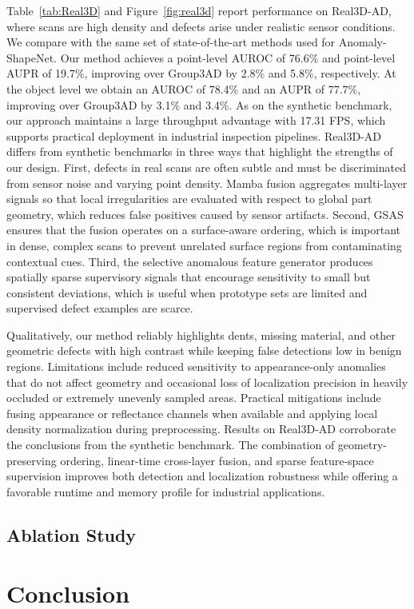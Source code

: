 Table~\ref{tab:Real3D} and Figure~\ref{fig:real3d} report performance on Real3D-AD, where scans are high density and defects arise under realistic sensor conditions. We compare with the same set of state-of-the-art methods used for Anomaly-ShapeNet. Our method achieves a point-level AUROC of 76.6\% and point-level AUPR of 19.7\%, improving over Group3AD by 2.8\% and 5.8\%, respectively. At the object level we obtain an AUROC of 78.4\% and an AUPR of 77.7\%, improving over Group3AD by 3.1\% and 3.4\%. As on the synthetic benchmark, our approach maintains a large throughput advantage with 17.31 FPS, which supports practical deployment in industrial inspection pipelines. Real3D-AD differs from synthetic benchmarks in three ways that highlight the strengths of our design. First, defects in real scans are often subtle and must be discriminated from sensor noise and varying point density. Mamba fusion aggregates multi-layer signals so that local irregularities are evaluated with respect to global part geometry, which reduces false positives caused by sensor artifacts. Second, GSAS ensures that the fusion operates on a surface-aware ordering, which is important in dense, complex scans to prevent unrelated surface regions from contaminating contextual cues. Third, the selective anomalous feature generator produces spatially sparse supervisory signals that encourage sensitivity to small but consistent deviations, which is useful when prototype sets are limited and supervised defect examples are scarce.

Qualitatively, our method reliably highlights dents, missing material, and other geometric defects with high contrast while keeping false detections low in benign regions. Limitations include reduced sensitivity to appearance-only anomalies that do not affect geometry and occasional loss of localization precision in heavily occluded or extremely unevenly sampled areas. Practical mitigations include fusing appearance or reflectance channels when available and applying local density normalization during preprocessing. Results on Real3D-AD corroborate the conclusions from the synthetic benchmark. The combination of geometry-preserving ordering, linear-time cross-layer fusion, and sparse feature-space supervision improves both detection and localization robustness while offering a favorable runtime and memory profile for industrial applications.

\subsection{Ablation Study}


\section{Conclusion}


